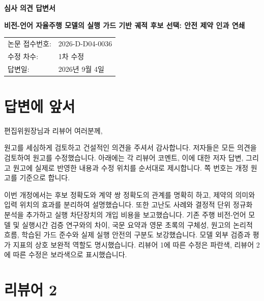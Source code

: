 \documentclass[11pt]{article}
\newcommand{\manuscripttitle}{비전-언어 자율주행 모델의 실행 가드 기반 궤적 후보 선택: 안전 제약 인과 연쇄}
\newcommand{\manuscriptid}{2026-D-D04-0036}
\newcommand{\revisionround}{1차 수정}
\newcommand{\responsedate}{2026년 9월 4일}
\begin{document}
\begin{center}
  {\LARGE\bfseries 심사 의견 답변서\par}
  \vspace{1em}
  {\large\bfseries \manuscripttitle\par}
\end{center}

\vspace{0.8em}
\begin{tabular}{@{}ll@{}}
논문 접수번호: & \manuscriptid \\
수정 차수: & \revisionround \\
답변일: & \responsedate
\end{tabular}

\section*{답변에 앞서}

편집위원장님과 리뷰어 여러분께,

원고를 세심하게 검토하고 건설적인 의견을 주셔서 감사합니다. 저자들은 모든 의견을
검토하여 원고를 수정했습니다. 아래에는 각 리뷰어 코멘트, 이에 대한 저자 답변,
그리고 원고에 실제로 반영한 내용과 수정 위치를 순서대로 제시합니다. 쪽 번호는
개정 원고를 기준으로 합니다.

이번 개정에서는 후보 정확도와 계약 쌍 정확도의 관계를 명확히 하고, 제약의 의미와
입력 위치의 효과를 분리하여 설명했습니다. 또한 고난도 사례와 결정적 단위 정규화
분석을 추가하고 실행 차단장치의 개입 비용을 보고했습니다. 기존 주행 비전-언어
모델 및 실행시간 검증 연구와의 차이, 국문 요약과 영문 초록의 구체성, 원고의 논리적
흐름, 학습된 가드 준수와 실제 실행 안전의 구분도 보강했습니다. 모델 외부 검증과
평가 지표의 상호 보완적 역할도 명시했습니다. 리뷰어 1에 따른 수정은 파란색,
리뷰어 2에 따른 수정은 보라색으로 표시했습니다.

\section*{리뷰어 2}
\end{document}
